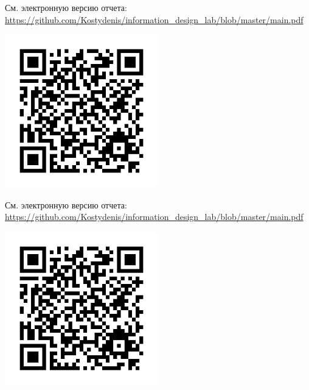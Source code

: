 \setcounter{section}{0}

См. электронную версию отчета: \url{https://github.com/Kostydenis/information_design_lab/blob/master/main.pdf}
\label{lst:istu_report}
\label{lst:customCodes}
\begin{center}
	\includegraphics[width=0.5\textwidth]{pics/qr.jpg}
\end{center}




См. электронную версию отчета: \url{https://github.com/Kostydenis/information_design_lab/blob/master/main.pdf}
\label{lst:lab1}
\begin{center}
	\includegraphics[width=0.5\textwidth]{pics/qr.jpg}
\end{center}
